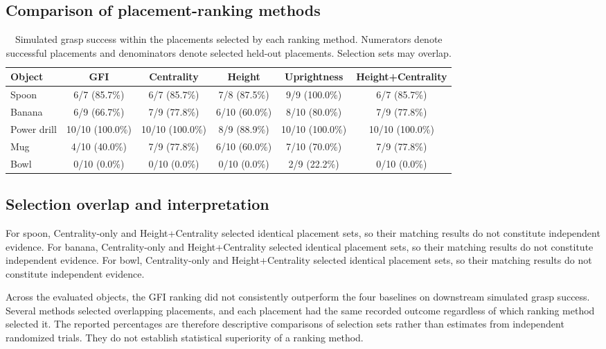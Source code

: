 \subsection{Comparison of placement-ranking methods}
\begin{table}[t]
\centering
\caption{Simulated grasp success within the placements selected by each ranking method. Numerators denote successful placements and denominators denote selected held-out placements. Selection sets may overlap.}
\label{tab:ranking_grasp_comparison}
\scriptsize
\begin{tabular}{lccccc}
\hline
Object & GFI & Centrality & Height & Uprightness & Height+Centrality \\
\hline
Spoon & 6/7 (85.7\%) & 6/7 (85.7\%) & 7/8 (87.5\%) & 9/9 (100.0\%) & 6/7 (85.7\%) \\
Banana & 6/9 (66.7\%) & 7/9 (77.8\%) & 6/10 (60.0\%) & 8/10 (80.0\%) & 7/9 (77.8\%) \\
Power drill & 10/10 (100.0\%) & 10/10 (100.0\%) & 8/9 (88.9\%) & 10/10 (100.0\%) & 10/10 (100.0\%) \\
Mug & 4/10 (40.0\%) & 7/9 (77.8\%) & 6/10 (60.0\%) & 7/10 (70.0\%) & 7/9 (77.8\%) \\
Bowl & 0/10 (0.0\%) & 0/10 (0.0\%) & 0/10 (0.0\%) & 2/9 (22.2\%) & 0/10 (0.0\%) \\
\hline
\end{tabular}
\end{table}

\subsection{Selection overlap and interpretation}
For spoon, Centrality-only and Height+Centrality selected identical placement sets, so their matching results do not constitute independent evidence.
For banana, Centrality-only and Height+Centrality selected identical placement sets, so their matching results do not constitute independent evidence.
For bowl, Centrality-only and Height+Centrality selected identical placement sets, so their matching results do not constitute independent evidence.

Across the evaluated objects, the GFI ranking did not consistently outperform the four baselines on downstream simulated grasp success. Several methods selected overlapping placements, and each placement had the same recorded outcome regardless of which ranking method selected it. The reported percentages are therefore descriptive comparisons of selection sets rather than estimates from independent randomized trials. They do not establish statistical superiority of a ranking method.

